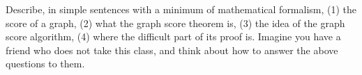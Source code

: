 \begin{exercise}
  Describe, in simple sentences with a minimum of mathematical formalism, (1) the score
  of a graph, (2) what the graph score theorem is, (3) the idea of the 
  graph score algorithm, (4) where the difficult part of its proof is.
  Imagine you have a friend who does not take this class, and think about how to answer
  the above questions to them.
\end{exercise} 

